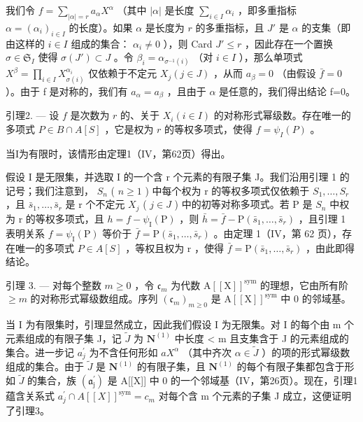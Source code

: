 我们令 \(f = \sum_{|\alpha| = r} a_{\alpha} X^{\alpha}\) （其中 \(|\alpha|\) 是长度 \(\sum_{i \in I} \alpha_i\) ，即多重指标 \(\alpha = (\alpha_i)_{i \in I}\) 的长度）。如果 \(\alpha\) 是长度为 \(r\) 的多重指标，且 \(J'\) 是 \(\alpha\) 的支集（即由这样的 \(i \in I\) 组成的集合： \(\alpha_i \neq 0\) ），则 Card \(J' \leqslant r\) ，因此存在一个置换 \(\sigma \in \mathfrak{S}_I\) 使得 \(\sigma(J') \subset J\) 。令 \(\beta_i = \alpha_{\sigma^{-1}(i)}\) （对 \(i \in I\) ），那么单项式 \(X^\beta = \prod_{i \in I} X_{\sigma(i)}^{\alpha_i}\) 仅依赖于不定元 \(X_j (j \in J)\) ，从而 \(a_\beta = 0\) （由假设 \(\bar{f}=0\) ）。由于 f 是对称的，我们有 \(a_{\alpha}=a_{\beta}\) ，且由于 \(\alpha\) 是任意的，我们得出结论 f=0。

引理2. --- 设 \(f\) 是次数为 \(r\) 的、关于 \(X_i (i \in I)\) 的对称形式幂级数。存在唯一的多项式 \(P \in B \cap A[S]\) ，它是权为 \(r\) 的等权多项式，使得 \(f = \psi_I(P)\) 。

当I为有限时，该情形由定理1（IV，第62页）得出。

假设 I 是无限集，并选取 I 的一个含 r 个元素的有限子集 J。我们沿用引理 1 的记号；我们注意到， \(S_{n}\) ( \(n \geqslant 1\) ) 中每个权为 r 的等权多项式仅依赖于 \(S_{1}, \ldots, S_{r}\) ，且 \(\bar{s}_{1}, \ldots, \bar{s}_{r}\) 是 r 个不定元 \(X_{j}\) ( \(j \in J\) ) 中的初等对称多项式。若 P 是 \(S_{n}\) 中权为 r 的等权多项式，且 \(h = f - \psi_{\mathrm{I}}(\mathrm{P})\) ，则 \(\bar{h} = \bar{f} - \mathrm{P}(\bar{s}_{1}, \ldots, \bar{s}_{r})\) ，且引理 1 表明关系 \(f = \psi_{\mathrm{I}}(\mathrm{P})\) 等价于 \(\bar{f} = \mathrm{P}(\bar{s}_{1}, \ldots, \bar{s}_{r})\) 。由定理 1（IV，第 62 页），存在唯一的多项式 \(P \in A[S]\) ，等权且权为 r ，使得 \(\bar{f} = \mathrm{P}(\bar{s}_{1}, \ldots, \bar{s}_{r})\) ，由此即得结论。

引理 3. --- 对每个整数 \(m \geqslant 0\) ，令 \(\mathfrak{c}_m\) 为代数 \(\mathrm{A}[[\mathrm{X}]]^{\mathrm{sym}}\) 的理想，它由所有阶 \(\geqslant m\) 的对称形式幂级数组成。序列 \((\mathfrak{c}_m)_{m \geqslant 0}\) 是 \(\mathrm{A}[[\mathrm{X}]]^{\mathrm{sym}}\) 中 0 的邻域基。

当 I 为有限集时，引理显然成立，因此我们假设 I 为无限集。对 I 的每个由 m 个元素组成的有限子集 J，记 \(\tilde{J}\) 为 \(\mathbf{N}^{(1)}\) 中长度 \textless{} m 且支集含于 J 的元素组成的集合。进一步记 \(a_{j}^{\prime}\) 为不含任何形如 \(aX^{\alpha}\) （其中齐次 \(\alpha \in \tilde{J}\) ）的项的形式幂级数组成的集合。由于 \(\tilde{J}\) 是 \(\mathbf{N}^{(1)}\) 的有限子集，且 \(\mathbf{N}^{(1)}\) 的每个有限子集都包含于形如 \(\tilde{J}\) 的集合，族 \((\mathfrak{a}_{\mathrm{j}}^{\prime})\) 是 A{[}{[}X{]}{]} 中 0 的一个邻域基（IV，第26页）。现在，引理1蕴含关系式 \(a_{j}^{\prime} \cap A[[X]]^{\text{sym}} = c_{m}\) 对每个含 m 个元素的子集 J 成立，这便证明了引理3。

